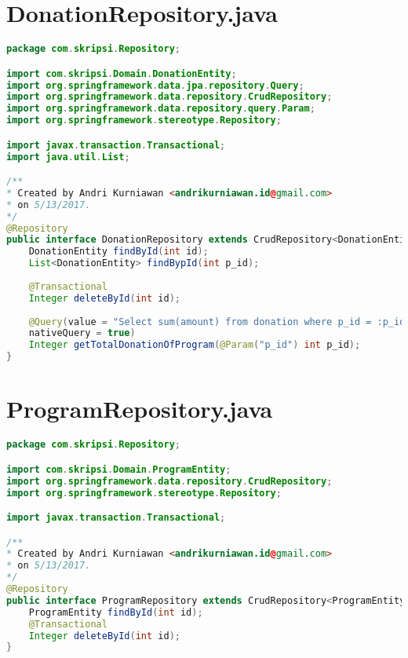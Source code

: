 \section*{DonationRepository.java}
\begin{lstlisting}[caption={Berkas DonationRepository.java},label={lst:DonationRepository},language=Java]
package com.skripsi.Repository;

import com.skripsi.Domain.DonationEntity;
import org.springframework.data.jpa.repository.Query;
import org.springframework.data.repository.CrudRepository;
import org.springframework.data.repository.query.Param;
import org.springframework.stereotype.Repository;

import javax.transaction.Transactional;
import java.util.List;

/**
* Created by Andri Kurniawan <andrikurniawan.id@gmail.com>
* on 5/13/2017.
*/
@Repository
public interface DonationRepository extends CrudRepository<DonationEntity, Integer> {
	DonationEntity findById(int id);
	List<DonationEntity> findBypId(int p_id);
	
	@Transactional
	Integer deleteById(int id);
	
	@Query(value = "Select sum(amount) from donation where p_id = :p_id",
	nativeQuery = true)
	Integer getTotalDonationOfProgram(@Param("p_id") int p_id);
}

\end{lstlisting}

\newpage
\section*{ProgramRepository.java}
\begin{lstlisting}[caption={Berkas ProgramRepository.java},label={lst:ProgramRepository},language=Java]
package com.skripsi.Repository;

import com.skripsi.Domain.ProgramEntity;
import org.springframework.data.repository.CrudRepository;
import org.springframework.stereotype.Repository;

import javax.transaction.Transactional;

/**
* Created by Andri Kurniawan <andrikurniawan.id@gmail.com>
* on 5/13/2017.
*/
@Repository
public interface ProgramRepository extends CrudRepository<ProgramEntity, Integer> {
	ProgramEntity findById(int id);
	@Transactional
	Integer deleteById(int id);
}

\end{lstlisting}

\newpage
